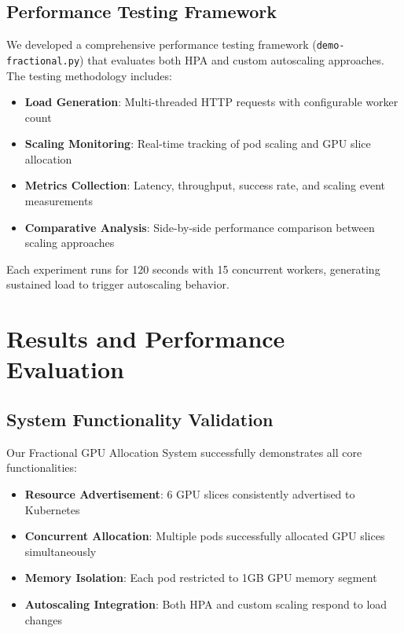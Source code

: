 \documentclass[10pt,twocolumn,letterpaper]{article}
\begin{document}
\subsection{Performance Testing Framework}

We developed a comprehensive performance testing framework (\texttt{demo-fractional.py}) that evaluates both HPA and custom autoscaling approaches. The testing methodology includes:

\begin{itemize}
\item \textbf{Load Generation}: Multi-threaded HTTP requests with configurable worker count
\item \textbf{Scaling Monitoring}: Real-time tracking of pod scaling and GPU slice allocation
\item \textbf{Metrics Collection}: Latency, throughput, success rate, and scaling event measurements
\item \textbf{Comparative Analysis}: Side-by-side performance comparison between scaling approaches
\end{itemize}

Each experiment runs for 120 seconds with 15 concurrent workers, generating sustained load to trigger autoscaling behavior.

\section{Results and Performance Evaluation}

\subsection{System Functionality Validation}

Our Fractional GPU Allocation System successfully demonstrates all core functionalities:

\begin{itemize}
\item \textbf{Resource Advertisement}: 6 GPU slices consistently advertised to Kubernetes
\item \textbf{Concurrent Allocation}: Multiple pods successfully allocated GPU slices simultaneously  
\item \textbf{Memory Isolation}: Each pod restricted to 1GB GPU memory segment
\item \textbf{Autoscaling Integration}: Both HPA and custom scaling respond to load changes
\end{itemize}
\end{document}
